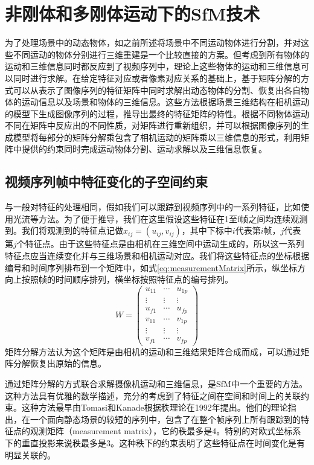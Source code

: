 \section{非刚体和多刚体运动下的SfM技术}
\label{subsec:non-rigid_SfM}
为了处理场景中的动态物体，如之前所述将场景中不同运动物体进行分割，并对这些不同运动的物体分别进行三维重建是一个比较直接的方案。但考虑到所有物体的运动和三维信息同时都反应到了视频序列中，理论上这些物体的运动和三维信息可以同时进行求解。在给定特征对应或者像素对应关系的基础上，基于矩阵分解的方式可以从表示了图像序列的特征矩阵中同时求解出动态物体的分割、恢复出各自物体的运动信息以及场景和物体的三维信息。这些方法根据场景三维结构在相机运动的模型下生成图像序列的过程，推导出最终的特征矩阵的特性。根据不同物体运动不同在矩阵中反应出的不同性质，对矩阵进行重新组织，并可以根据图像序列的生成模型将每部分的矩阵分解乘包含了相机运动的矩阵乘以三维信息的形式，利用矩阵中提供的约束同时完成运动物体分割、运动求解以及三维信息恢复。

\subsection{视频序列帧中特征变化的子空间约束}\label{subsec:subspace}
与一般对特征的处理相同，假如我们可以跟踪到视频序列中的一系列特征，比如使用光流等方法。为了便于推导，我们在这里假设这些特征在1至f帧之间均连续观测到。我们将观测到的特征点记做$x_{ij}=(u_{ij},v_{ij})$，其中下标中$i$代表第$i$帧，$j$代表第$j$个特征点。由于这些特征点是由相机在三维空间中运动生成的，所以这一系列特征点应当连续变化并与三维场景和相机运动对应。我们将这些特征点的坐标根据编号和时间序列排布到一个矩阵中，如式\eqref{eq:measurementMatrix}所示，纵坐标方向上按照帧的时间顺序排列，横坐标按照特征点的编号排列。
\begin{equation}\label{eq:measurementMatrix}
W=
\begin{pmatrix}
u_{11}& \cdots & u_{1p}\\
\vdots& \vdots &\vdots\\
u_{f1}& \cdots & u_{fp}\\
v_{11}& \cdots & v_{1p}\\
\vdots& \vdots &\vdots\\
v_{f1}& \cdots & v_{fp}
\end{pmatrix}
\end{equation}
矩阵分解方法认为这个矩阵是由相机的运动和三维结果矩阵合成而成，可以通过矩阵分解恢复出原始的信息。

通过矩阵分解的方式联合求解摄像机运动和三维信息，是SfM中一个重要的方法。这种方法具有优雅的数学描述，充分的考虑到了特征之间在空间和时间上的关联约束。这种方法最早由Tomasi和Kanade\cite{wx-ref}根据秩理论在1992年提出。他们的理论指出，在一个面向静态场景的较短的序列中，包含了在整个帧序列上所有跟踪到的特征点的观测矩阵（measurement matrix），它的秩最多是4。特别的对欧式坐标系下的垂直投影来说秩最多是3。这种秩下的约束表明了这些特征点在时间变化是有明显关联的。
